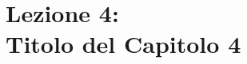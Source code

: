 \documentclass[12pt]{article}
\begin{document}
\section{Lezione 4:\\ \large{Titolo del Capitolo 4}}
\end{document}
